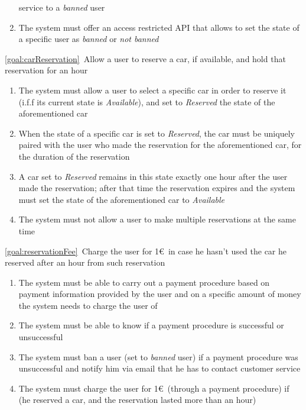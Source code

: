 \begin{description}
\begin{enumerate}[resume*]
   				service to a \emph{banned} user
   				\item The system must offer an access restricted API that allows to set the state of a
   				specific user as \emph{banned} or \emph{not banned}
   			\end{enumerate}
 	  	\item \ref{goal:carReservation}\ Allow a user to reserve a car, if available, and hold that
 	  	reservation for an hour
 	  		\begin{enumerate}[resume*]
 	  			\item The system must allow a user to select a specific car in order to reserve it 
 	  			(i.f.f its current state is \emph{Available}), and set to \emph{Reserved} the state of
 	  			the aforementioned car
 	  			\item When the state of a specific car is set to \emph{Reserved}, the car must be
 	  			uniquely paired with the user who made the reservation for the aforementioned car, for
 	  			the duration of the reservation
 	  			\item A car set to \emph{Reserved} remains in this state exactly one hour after the user
 	  			made the reservation; after that time the reservation expires and the system
 	  			must set the state of the aforementioned car to \emph{Available}
 	  			\item The system must not allow a user to make multiple reservations at the same time
   			\end{enumerate}
  		\item \ref{goal:reservationFee}\ Charge the user for 1\euro\ in case he hasn't used the car he reserved after an hour from such reservation
  			\begin{enumerate}[resume*]
  				\item The system must be able to carry out a payment procedure based on payment
  				information provided by the user and on a specific amount of money the system needs to charge the user of
  				\item The system must be able to know if a payment procedure is successful or
  				unsuccessful
  				\item The system must ban a user (set to \emph{banned} user) if a
  				payment procedure was unsuccessful and notify him via email that he has to
  				contact customer service
  				\item The system must charge the user for 1\euro\ (through a payment procedure) if
  				(he reserved a car, and the reservation lasted more than an hour)

\end{enumerate}
\end{description}
